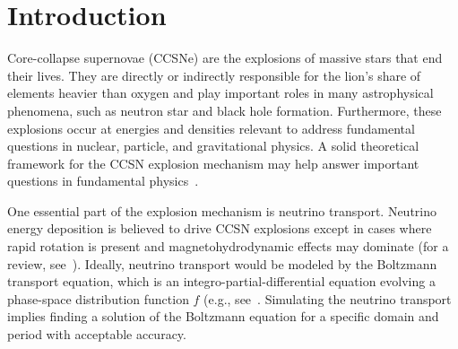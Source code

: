 \section{Introduction}

Core-collapse supernovae (CCSNe) are the explosions of massive stars that end their lives.
They are directly or indirectly responsible for the lion's share of elements heavier than oxygen and play important roles in many astrophysical phenomena, such as neutron star and black hole formation.
Furthermore, these explosions occur at energies and densities relevant to address fundamental questions in nuclear, particle, and gravitational physics. 
A solid theoretical framework for the CCSN explosion mechanism may help answer important questions in fundamental physics~\cite{janka_etal_2007}.

One essential part of the explosion mechanism is neutrino transport.
Neutrino energy deposition is believed to drive CCSN explosions except in cases where rapid rotation is present and magnetohydrodynamic effects may dominate 
(for a review, see~\cite{mezzacappa_2005,janka_2012,burrows_2013,muller_2016}).
Ideally, neutrino transport would be modeled by the Boltzmann transport equation, which is an integro-partial-differential equation evolving a phase-space distribution function $f$ (e.g., see~\cite{mezzacappaBruenn_1993a,mezzacappaBruenn_1993b,mezzacappaBruenn_1993c,mezzacappa_etal_2001,liebendoerfer_etal_2001,liebendoerfer_etal_2004,livne_etal_2004,liebendoerfer_etal_2005,ott_etal_2008,sumiyoshiYamada_2012,nagakura_etal_2014,sumiyoshi_etal_2014,nagakura_etal_2018}.
Simulating the neutrino transport implies finding a solution of the Boltzmann equation for a specific domain and period with acceptable accuracy.

